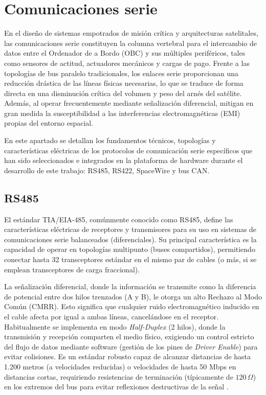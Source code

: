 \section{Comunicaciones serie}

En el diseño de sistemas empotrados de misión crítica y arquitecturas satelitales, las
comunicaciones serie constituyen la columna vertebral para el intercambio de datos entre el
Ordenador de a Bordo (OBC) y sus múltiples periféricos, tales como sensores de actitud,
actuadores mecánicos y cargas de pago. Frente a las topologías de bus paralelo
tradicionales, los enlaces serie proporcionan una reducción drástica de las líneas físicas
necesarias, lo que se traduce de forma directa en una disminución crítica del volumen y peso
del arnés del satélite. Además, al operar frecuentemente mediante señalización diferencial,
mitigan en gran medida la susceptibilidad a las interferencias electromagnéticas (EMI)
propias del entorno espacial.

En este apartado se detallan los fundamentos técnicos, topologías y características eléctricas
de los protocolos de comunicación serie específicos que han sido seleccionados e integrados
en la plataforma de hardware durante el desarrollo de este trabajo: RS485, RS422, SpaceWire
y bus CAN.

\subsection{RS485}

El estándar TIA/EIA-485, comúnmente conocido como RS485, define las características
eléctricas de receptores y transmisores para su uso en sistemas de comunicaciones serie
balanceados (diferenciales). Su principal característica es la capacidad de operar en
topologías multipunto (buses compartidos), permitiendo conectar hasta 32 transceptores
estándar en el mismo par de cables (o más, si se emplean transceptores de carga
fraccional).

La señalización diferencial, donde la información se transmite como la diferencia de potencial
entre dos hilos trenzados (A y B), le otorga un alto Rechazo al Modo Común (CMRR). Esto
significa que cualquier ruido electromagnético inducido en el cable afecta por igual a ambas
líneas, cancelándose en el receptor. Habitualmente se implementa en modo
\textit{Half-Duplex} (2 hilos), donde la transmisión y recepción comparten el medio físico, exigiendo
un control estricto del flujo de datos mediante software (gestión de los pines de
\textit{Driver Enable}) para evitar colisiones. Es un estándar robusto capaz de alcanzar distancias
de hasta 1.200 metros (a velocidades reducidas) o velocidades de hasta 50 Mbps en
distancias cortas, requiriendo resistencias de terminación (típicamente de $120\,\Omega$) en
los extremos del bus para evitar reflexiones destructivas de la señal
\cite{ti2014rs485,eia485a}.

